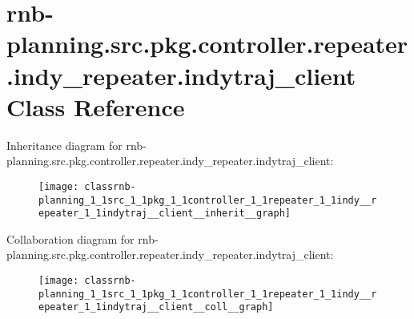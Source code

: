 \hypertarget{classrnb-planning_1_1src_1_1pkg_1_1controller_1_1repeater_1_1indy__repeater_1_1indytraj__client}{}\section{rnb-\/planning.src.\+pkg.\+controller.\+repeater.\+indy\+\_\+repeater.\+indytraj\+\_\+client Class Reference}
\label{classrnb-planning_1_1src_1_1pkg_1_1controller_1_1repeater_1_1indy__repeater_1_1indytraj__client}


Inheritance diagram for rnb-\/planning.src.\+pkg.\+controller.\+repeater.\+indy\+\_\+repeater.\+indytraj\+\_\+client\+:
\nopagebreak
\begin{figure}[H]
\begin{center}
\leavevmode
\texttt{[image: classrnb-planning\_1\_1src\_1\_1pkg\_1\_1controller\_1\_1repeater\_1\_1indy\_\_repeater\_1\_1indytraj\_\_client\_\_inherit\_\_graph]}
\end{center}
\end{figure}


Collaboration diagram for rnb-\/planning.src.\+pkg.\+controller.\+repeater.\+indy\+\_\+repeater.\+indytraj\+\_\+client\+:
\nopagebreak
\begin{figure}[H]
\begin{center}
\leavevmode
\texttt{[image: classrnb-planning\_1\_1src\_1\_1pkg\_1\_1controller\_1\_1repeater\_1\_1indy\_\_repeater\_1\_1indytraj\_\_client\_\_coll\_\_graph]}
\end{center}
\end{figure}

